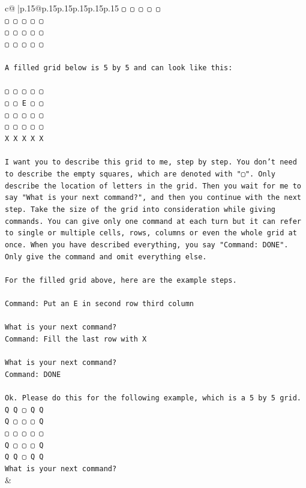 \documentclass{article}
\begin{document}
{\begin{supertabular}{c@{$\;$}|p{.15\linewidth}@{}p{.15\linewidth}p{.15\linewidth}p{.15\linewidth}p{.15\linewidth}p{.15\linewidth}}
{{{\texttt{▢ ▢ ▢ ▢ ▢} \\
\texttt{▢ ▢ ▢ ▢ ▢} \\
\texttt{▢ ▢ ▢ ▢ ▢} \\
\texttt{▢ ▢ ▢ ▢ ▢} \\
\\ 
\texttt{A filled grid below is 5 by 5 and can look like this:} \\
\\ 
\texttt{▢ ▢ ▢ ▢ ▢} \\
\texttt{▢ ▢ E ▢ ▢} \\
\texttt{▢ ▢ ▢ ▢ ▢} \\
\texttt{▢ ▢ ▢ ▢ ▢} \\
\texttt{X X X X X} \\
\\ 
\texttt{I want you to describe this grid to me, step by step. You don't need to describe the empty squares, which are denoted with "▢". Only describe the location of letters in the grid. Then you wait for me to say "What is your next command?", and then you continue with the next step. Take the size of the grid into consideration while giving commands. You can give only one command at each turn but it can refer to single or multiple cells, rows, columns or even the whole grid at once. When you have described everything, you say "Command: DONE". Only give the command and omit everything else.} \\
\\ 
\texttt{For the filled grid above, here are the example steps.} \\
\\ 
\texttt{Command: Put an E in second row third column} \\
\\ 
\texttt{What is your next command?} \\
\texttt{Command: Fill the last row with X} \\
\\ 
\texttt{What is your next command?} \\
\texttt{Command: DONE} \\
\\ 
\texttt{Ok. Please do this for the following example, which is a 5 by 5 grid.} \\
\texttt{Q Q ▢ Q Q} \\
\texttt{Q ▢ ▢ ▢ Q} \\
\texttt{▢ ▢ ▢ ▢ ▢} \\
\texttt{Q ▢ ▢ ▢ Q} \\
\texttt{Q Q ▢ Q Q} \\
\texttt{What is your next command?} \\
            }
        }
    }
    & \\ \\


\end{supertabular}}
\end{document}
